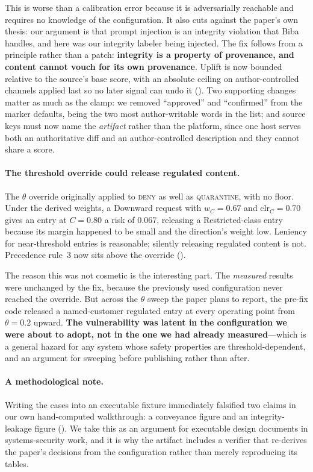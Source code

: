\documentclass[conference,compsoc]{IEEEtran}
\newcommand{\Cl}{\ensuremath{C}}                 %
\newcommand{\clr}{\ensuremath{\mathrm{clr}_C}}   %
\newcommand{\wC}{\ensuremath{w_C}}
\begin{document}
This is worse than a calibration error because it is adversarially reachable
and requires no knowledge of the configuration. It also cuts against the
paper's own thesis: our argument is that prompt injection is an integrity
violation that Biba handles, and here was our integrity labeler being
injected. The fix follows from a principle rather than a patch:
\textbf{integrity is a property of provenance, and content cannot vouch for
its own provenance}. Uplift is now bounded relative to the source's base score,
with an absolute ceiling on author-controlled channels applied last so no later
signal can undo it (). Two supporting changes matter as
much as the clamp: we removed ``approved'' and ``confirmed'' from the marker
defaults, being the two most author-writable words in the list; and source keys
must now name the \emph{artifact} rather than the platform, since one host
serves both an authoritative diff and an author-controlled description and they
cannot share a score.

\paragraph{The threshold override could release regulated content.} The
$\theta$ override originally applied to \textsc{deny} as well as
\textsc{quarantine}, with no floor. Under the derived weights, a Downward
request with $\wC = 0.67$ and $\clr = 0.70$ gives an entry at $\Cl = 0.80$ a
risk of $0.067$, releasing a Restricted-class entry because its margin happened
to be small and the direction's weight low. Leniency for near-threshold entries
is reasonable; silently releasing regulated content is not. Precedence rule~3
now sits above the override ().

The reason this was not cosmetic is the interesting part. The \emph{measured}
results were unchanged by the fix, because the previously used configuration
never reached the override. But across the $\theta$ sweep the paper plans to
report, the pre-fix code released a named-customer regulated entry at every
operating point from $\theta = 0.2$ upward. \textbf{The vulnerability was
latent in the configuration we were about to adopt, not in the one we had
already measured}---which is a general hazard for any system whose safety
properties are threshold-dependent, and an argument for sweeping before
publishing rather than after.

\paragraph{A methodological note.} Writing the cases into an executable fixture
immediately falsified two claims in our own hand-computed walkthrough: a
conveyance figure and an integrity-leakage figure ().
We take this as an argument for executable design documents in systems-security
work, and it is why the artifact includes a verifier that re-derives the
paper's decisions from the configuration rather than merely reproducing its
tables.
\end{document}
